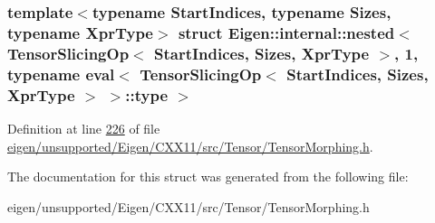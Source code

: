 \subsubsection*{template$<$typename Start\+Indices, typename Sizes, typename Xpr\+Type$>$\newline
struct Eigen\+::internal\+::nested$<$ Tensor\+Slicing\+Op$<$ Start\+Indices, Sizes, Xpr\+Type $>$, 1, typename eval$<$ Tensor\+Slicing\+Op$<$ Start\+Indices, Sizes, Xpr\+Type $>$ $>$\+::type $>$}



Definition at line \hyperlink{eigen_2unsupported_2_eigen_2_c_x_x11_2src_2_tensor_2_tensor_morphing_8h_source_l00226}{226} of file \hyperlink{eigen_2unsupported_2_eigen_2_c_x_x11_2src_2_tensor_2_tensor_morphing_8h_source}{eigen/unsupported/\+Eigen/\+C\+X\+X11/src/\+Tensor/\+Tensor\+Morphing.\+h}.



The documentation for this struct was generated from the following file\+:\begin{DoxyCompactItemize}
\item 
eigen/unsupported/\+Eigen/\+C\+X\+X11/src/\+Tensor/\+Tensor\+Morphing.\+h\end{DoxyCompactItemize}

